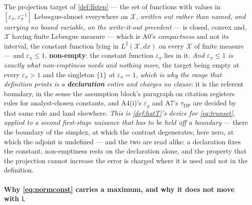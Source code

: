The projection target of \cref{def:lfstep} --- the set of functions with values in
$[\varepsilon_\pi,\varepsilon_\pi^{-1}]$ Lebesgue-almost everywhere on $\mathcal X$, \emph{written out
rather than named, and carrying no bound variable, on the write-it-out precedent} --- is closed, convex
and, $\mathcal X$ having finite Lebesgue measure --- which is A0's \emph{compactness} and not its
interval, the constant function lying in $L^{2}(\mathcal X,dx)$ on every $\mathcal X$ of finite measure
--- and $\varepsilon_\pi\le1$, \textbf{non-empty}: the constant function $\varepsilon_\pi$ lies in it.
\emph{And $\varepsilon_\pi\le1$ is exactly what non-emptiness needs and nothing more}, the target being
empty at every $\varepsilon_\pi>1$ and the singleton $\{1\}$ at $\varepsilon_\pi=1$, \emph{which is why
the range that definition prints is a \textbf{declaration} entire and charges no clause}: it is the
referent boundary, in the sense the assumption block's paragraph on citation registers rules for
analyst-chosen constants, and A4(i)'s $\varepsilon_\varrho$ and A7's $\tau_{\mathrm{DP}}$ are decided
by that same rule and land elsewhere. \emph{This is \cref{def:hatT}'s device for \eqref{eq:trunset},
applied to a second first-stage nuisance that has to be held off a boundary} --- there the boundary of
the simplex, at which the contrast degenerates; here zero, at which the adjoint is undefined --- and
the two are read alike: a declaration fixes the constant, non-emptiness rests on the declaration alone,
and the property that the projection cannot increase the error is charged where it is used and not in
the definition.

\paragraph{Why \eqref{eq:normconst} carries a maximum, and why it does not move with $\mathsf L$}

